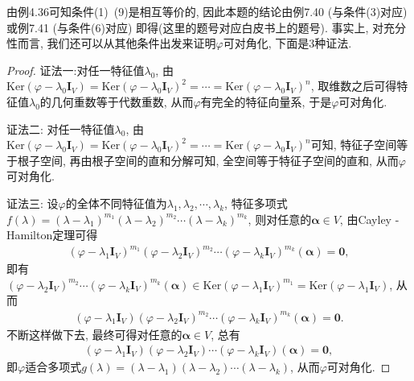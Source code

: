 \documentclass[../../main.tex]{subfiles}
\begin{document}
\begin{note}
由例4.36可知条件(1)~(9)是相互等价的, 因此本题的结论由例7.40 (与条件(3)对应) 或例7.41 (与条件(6)对应) 即得(这里的题号对应白皮书上的题号). 事实上, 对充分性而言, 我们还可以从其他条件出发来证明\(\varphi\)可对角化, 下面是\(3\)种证法.
\end{note}
\begin{proof}
{\color{blue}证法一:}对任一特征值\(\lambda_{0}\), 由\(\mathrm{Ker}(\varphi-\lambda_{0}\boldsymbol{I}_{V})=\mathrm{Ker}(\varphi-\lambda_{0}\boldsymbol{I}_{V})^{2}=\cdots=\mathrm{Ker}(\varphi-\lambda_{0}\boldsymbol{I}_{V})^{n}\), 取维数之后可得特征值\(\lambda_{0}\)的几何重数等于代数重数, 从而\(\varphi\)有完全的特征向量系, 于是\(\varphi\)可对角化.
    
{\color{blue}证法二:} 对任一特征值\(\lambda_{0}\), 由\(\mathrm{Ker}(\varphi-\lambda_{0}\boldsymbol{I}_{V})=\mathrm{Ker}(\varphi-\lambda_{0}\boldsymbol{I}_{V})^{2}=\cdots=\mathrm{Ker}(\varphi-\lambda_{0}\boldsymbol{I}_{V})^{n}\)可知, 特征子空间等于根子空间, 再由根子空间的直和分解可知, 全空间等于特征子空间的直和, 从而\(\varphi\)可对角化.

{\color{blue}证法三:} 设\(\varphi\)的全体不同特征值为\(\lambda_{1},\lambda_{2},\cdots,\lambda_{k}\), 特征多项式\(f(\lambda)=(\lambda-\lambda_{1})^{m_{1}}(\lambda-\lambda_{2})^{m_{2}}\cdots(\lambda-\lambda_{k})^{m_{k}}\), 则对任意的\(\boldsymbol{\alpha}\in V\), 由Cayley - Hamilton定理可得
\begin{align*}
(\varphi-\lambda_{1}\boldsymbol{I}_{V})^{m_{1}}(\varphi-\lambda_{2}\boldsymbol{I}_{V})^{m_{2}}\cdots(\varphi-\lambda_{k}\boldsymbol{I}_{V})^{m_{k}}(\boldsymbol{\alpha}) = \boldsymbol{0},
\end{align*}
即有\((\varphi-\lambda_{2}\boldsymbol{I}_{V})^{m_{2}}\cdots(\varphi-\lambda_{k}\boldsymbol{I}_{V})^{m_{k}}(\boldsymbol{\alpha})\in\mathrm{Ker}(\varphi-\lambda_{1}\boldsymbol{I}_{V})^{m_{1}}=\mathrm{Ker}(\varphi-\lambda_{1}\boldsymbol{I}_{V})\), 从而
\begin{align*}
(\varphi-\lambda_{1}\boldsymbol{I}_{V})(\varphi-\lambda_{2}\boldsymbol{I}_{V})^{m_{2}}\cdots(\varphi-\lambda_{k}\boldsymbol{I}_{V})^{m_{k}}(\boldsymbol{\alpha}) = \boldsymbol{0}.
\end{align*}
不断这样做下去, 最终可得对任意的\(\boldsymbol{\alpha}\in V\), 总有
\begin{align*}
(\varphi-\lambda_{1}\boldsymbol{I}_{V})(\varphi-\lambda_{2}\boldsymbol{I}_{V})\cdots(\varphi-\lambda_{k}\boldsymbol{I}_{V})(\boldsymbol{\alpha}) = \boldsymbol{0},
\end{align*}
即\(\varphi\)适合多项式\(g(\lambda)=(\lambda-\lambda_{1})(\lambda-\lambda_{2})\cdots(\lambda-\lambda_{k})\), 从而\(\varphi\)可对角化. 
\end{proof}
\end{document}
